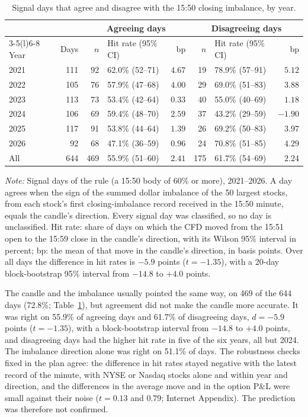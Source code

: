 \documentclass[12pt,letterpaper]{article}
\newcommand{\tabnotes}[1]{\par\vspace{5pt}\parbox{\linewidth}{\footnotesize\setlength{\parindent}{0pt}\textit{Note:} #1}\par}
\begin{document}
\begin{table}[htbp]
\centering
\caption{Signal days that agree and disagree with the 15:50 closing imbalance, by year.}
\label{tab:imbyear}
\begin{tabular}{@{}lrrlrrlr@{}}
\toprule
 & & \multicolumn{3}{c}{Agreeing days} & \multicolumn{3}{c}{Disagreeing days} \\
\cmidrule(lr){3-5}\cmidrule(l){6-8}
Year & Days & $n$ & Hit rate (95\% CI) & bp & $n$ & Hit rate (95\% CI) & bp \\
\midrule
2021 & 111 & 92 & 62.0\% (52--71) & $4.67$ & 19 & 78.9\% (57--91) & $5.12$ \\
2022 & 105 & 76 & 57.9\% (47--68) & $4.00$ & 29 & 69.0\% (51--83) & $3.88$ \\
2023 & 113 & 73 & 53.4\% (42--64) & $0.33$ & 40 & 55.0\% (40--69) & $1.18$ \\
2024 & 106 & 69 & 59.4\% (48--70) & $2.59$ & 37 & 43.2\% (29--59) & $-1.90$ \\
2025 & 117 & 91 & 53.8\% (44--64) & $1.39$ & 26 & 69.2\% (50--83) & $3.97$ \\
2026 & 92 & 68 & 47.1\% (36--59) & $0.96$ & 24 & 70.8\% (51--85) & $4.29$ \\
\midrule
All & 644 & 469 & 55.9\% (51--60) & $2.41$ & 175 & 61.7\% (54--69) & $2.24$ \\
\bottomrule
\end{tabular}
\tabnotes{Signal days of the rule (a 15:50 body of 60\% or more), 2021--2026. A day agrees when the sign of the
summed dollar imbalance of the 50 largest stocks, from each stock's first closing-imbalance record received in the
15:50 minute, equals the candle's direction. Every signal day was classified, so no day is unclassified. Hit rate:
share of days on which the CFD moved from the 15:51 open to the 15:59 close in the candle's direction, with its
Wilson 95\% interval in percent; bp: the mean of that move in the candle's direction, in basis points. Over all
days the difference in hit rates is $-5.9$ points ($t = -1.35$), with a 20-day block-bootstrap 95\%
interval from $-14.8$ to $+4.0$ points.}
\end{table}

The candle and the imbalance usually pointed the same way, on 469 of the 644
days (72.8\%; Table~\ref{tab:imbyear}), but agreement did not make the candle
more accurate. It was right on 55.9\% of agreeing days and 61.7\% of
disagreeing days, $d = -5.9$ points ($t = -1.35$), with a block-bootstrap interval
from $-14.8$ to $+4.0$ points, and disagreeing days had the higher hit rate in
five of the six years, all but 2024. The imbalance direction alone was right on
51.1\% of days. The robustness checks fixed in the plan agree: the difference in
hit rates stayed negative with the latest record of the minute, with NYSE or
Nasdaq stocks alone and within year and direction, and the differences in the
average move and in the option P\&L were small against their noise ($t = 0.13$
and $0.79$; Internet Appendix). The prediction was therefore not confirmed.
\end{document}
